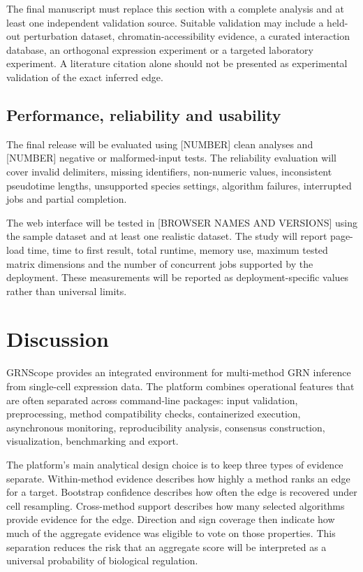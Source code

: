 \documentclass[unnumsec,webpdf,modern,large]{oup-authoring-template}%
\begin{document}
The final manuscript must replace this section with a complete analysis and at least one independent validation source. Suitable validation may include a held-out perturbation dataset, chromatin-accessibility evidence, a curated interaction database, an orthogonal expression experiment or a targeted laboratory experiment. A literature citation alone should not be presented as experimental validation of the exact inferred edge.

\subsection{Performance, reliability and usability}

The final release will be evaluated using [NUMBER] clean analyses and [NUMBER] negative or malformed-input tests. The reliability evaluation will cover invalid delimiters, missing identifiers, non-numeric values, inconsistent pseudotime lengths, unsupported species settings, algorithm failures, interrupted jobs and partial completion.

The web interface will be tested in [BROWSER NAMES AND VERSIONS] using the sample dataset and at least one realistic dataset. The study will report page-load time, time to first result, total runtime, memory use, maximum tested matrix dimensions and the number of concurrent jobs supported by the deployment. These measurements will be reported as deployment-specific values rather than universal limits.

\section{Discussion}

GRNScope provides an integrated environment for multi-method GRN inference from single-cell expression data. The platform combines operational features that are often separated across command-line packages: input validation, preprocessing, method compatibility checks, containerized execution, asynchronous monitoring, reproducibility analysis, consensus construction, visualization, benchmarking and export.

The platform's main analytical design choice is to keep three types of evidence separate. Within-method evidence describes how highly a method ranks an edge for a target. Bootstrap confidence describes how often the edge is recovered under cell resampling. Cross-method support describes how many selected algorithms provide evidence for the edge. Direction and sign coverage then indicate how much of the aggregate evidence was eligible to vote on those properties. This separation reduces the risk that an aggregate score will be interpreted as a universal probability of biological regulation.
\end{document}
